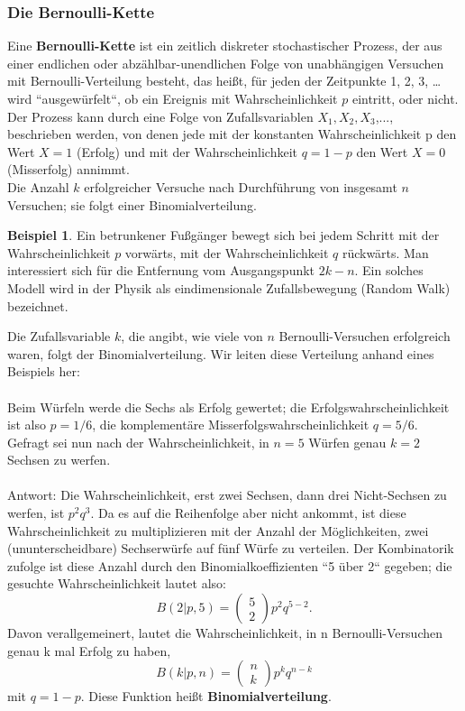 \documentclass[a4paper,10pt,DIV9, BCOR12mm, oneside,openright,openbib]{scrreprt}
\theoremstyle{definition}
\newtheorem{exmp}{Beispiel}[section]
\theoremstyle{plain}
\begin{document}
\subsubsection{Die Bernoulli-Kette}
Eine \textbf{Bernoulli-Kette} ist ein zeitlich diskreter stochastischer Prozess, der aus einer endlichen oder abzählbar-unendlichen Folge von unabhängigen Versuchen mit Bernoulli-Verteilung besteht, das heißt, für jeden der Zeitpunkte 1, 2, 3, … wird “ausgewürfelt“, ob ein Ereignis mit Wahrscheinlichkeit $ p $ eintritt, oder nicht.\\
Der Prozess kann durch eine Folge von Zufallsvariablen $ X_1, X_2, X_3 $,..., beschrieben werden, von denen jede mit der konstanten Wahrscheinlichkeit p den Wert $ X=1 $ (Erfolg) und mit der Wahrscheinlichkeit $ q=1-p $ den Wert $ X=0 $ (Misserfolg) annimmt. \\
Die Anzahl $ k $ erfolgreicher Versuche nach Durchführung von insgesamt $ n $ Versuchen; sie folgt einer Binomialverteilung.\\
 \begin{exmp}
   Ein betrunkener Fußgänger  bewegt sich bei jedem Schritt mit der Wahrscheinlichkeit $ p $ vorwärts, mit der Wahrscheinlichkeit $ q $ rückwärts. Man interessiert sich für die Entfernung vom Ausgangspunkt $ 2k-n $. Ein solches Modell wird in der Physik als eindimensionale Zufallsbewegung (Random Walk) bezeichnet.\\
 \end{exmp}
Die Zufallsvariable $ k $, die angibt, wie viele von $ n $ Bernoulli-Versuchen erfolgreich waren, folgt der Binomialverteilung. Wir leiten diese Verteilung anhand eines Beispiels her:\\
\\
Beim Würfeln werde die Sechs als Erfolg gewertet; die Erfolgswahrscheinlichkeit ist also $ p=1/6 $, die komplementäre Misserfolgswahrscheinlichkeit $ q=5/6 $. Gefragt sei nun nach der Wahrscheinlichkeit, in $ n=5 $ Würfen genau $ k=2 $ Sechsen zu werfen.\\
\\
Antwort: Die Wahrscheinlichkeit, erst zwei Sechsen, dann drei Nicht-Sechsen zu werfen, ist $ p^2q^3 $. Da es auf die Reihenfolge aber nicht ankommt, ist diese Wahrscheinlichkeit zu multiplizieren mit der Anzahl der Möglichkeiten, zwei (ununterscheidbare) Sechserwürfe auf fünf Würfe zu verteilen. Der Kombinatorik zufolge ist diese Anzahl durch den Binomialkoeffizienten “5 über 2“ gegeben; die gesuchte Wahrscheinlichkeit lautet also:\\
 \[ B(2 |p,5) = \left( \begin{matrix} 5\\ 2 \end{matrix} \right) p^2 q^{5-2}. \]
Davon verallgemeinert, lautet die Wahrscheinlichkeit, in n Bernoulli-Versuchen genau k mal Erfolg zu haben,\\
 \[ B(k|p,n) = \left( \begin{matrix} n\\ k \end{matrix} \right) p^k q^{n-k} \]
mit $ q=1-p $. Diese Funktion heißt \textbf{Binomialverteilung}.
\end{document}
